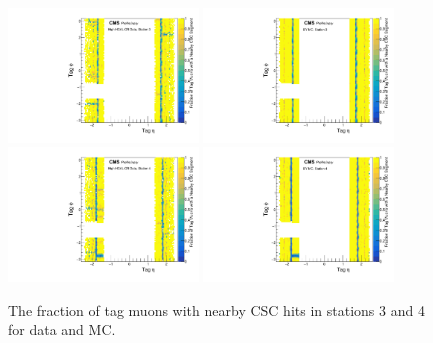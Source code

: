 \begin{figure}[htbp]
    \includegraphics[width=0.45\textwidth]{figures/cscNearbyFracData_station2.pdf}
    \hspace{0.01\textwidth}
    \centering
    \includegraphics[width=0.45\textwidth]{figures/cscNearbyFracMC_station2.pdf}
    \includegraphics[width=0.45\textwidth]{figures/cscNearbyFracData_station3.pdf}
    \hspace{0.01\textwidth}
    \includegraphics[width=0.45\textwidth]{figures/cscNearbyFracMC_station3.pdf}
    \caption[CSC segment efficiencies for stations 3 and 4]{The fraction of tag muons with nearby CSC hits in stations 3 and 4 for data and MC.}
    \label{fig:CSCeff2}
\end{figure}

